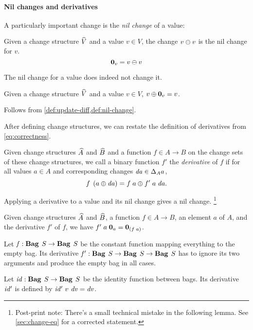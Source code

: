 \paragraph{Nil changes and derivatives}
A particularly important change is the \emph{nil change} of a value:
\begin{definition}
  \label{def:nil-change}
  Given a change structure $\widehat{V}$ and a value $v \in V$, the change
  $\Diff{v}{v}$ is the nil change for $v$.
  \[
    \Nil{v} = \Diff{v}{v} \qed
  \]
\end{definition}
The nil change for a value does indeed not change it.
\begin{lemma}
  \label{thm:update-nil}
  Given a change structure $\widehat{V}$ and a value $v \in V$,
  $\Apply{\Nil{v}}{v} = v$.
\end{lemma}

\begin{optionalproof}
Follows from \cref{def:update-diff,def:nil-change}.
\end{optionalproof}

After defining change structures, we can restate the definition of derivatives from \cref{eq:correctness}.

\begin{definition}[Derivatives]
  \label{def:derivatives}
  Given change structures $\widehat{A}$ and $\widehat{B}$ and a function $f \in A \to
  B$ on the change sets of these change structures, we call a binary function $f'$ the \emph{derivative} of $f$ if
  for all values $a \in A$ and corresponding changes $\D a \in
  \Change[A]{a}$,
  \[\App{f}{\Apply*{\D a}{a}} = \Apply{\App{\App{f'}{a}}{\D a}}{\App{f}{a}}\text{.}\qed\]
\end{definition}

Applying a derivative to a value and its nil change gives a nil
change.%
\footnote{Post-print note: There's a small technical mistake in
  the following lemma. See \cref{sec:change-eq} for a corrected
  statement.}
%
\begin{lemma}
  \label{thm:deriv-nil}
  Given change structures $\widehat{A}$ and
  $\widehat{B}$, a function $f \in A \to B$, an element $a$
  of $A$, and the derivative $f'$ of $f$, we have
  $\App{\App{f'}{a}}{\Nil{a}} = \Nil{\App* f a}$.
\end{lemma}

\begin{examples}
Let $\Term{f}:\Fun{\Bag S}{\Bag S}$ be the constant function mapping
everything to the empty bag. Its derivative
$\Term{f'}:\Fun{\Bag S}{\Fun{\Bag S}{\Bag S}}$ has to ignore its two
arguments and produce the empty bag in all cases.

Let $\Term{id}:\Fun{\Bag S}{\Bag S}$ be the identity function between
bags. Its derivative $\mathit{id'}$ is defined by
$\mathit{id'}~v~\mathit{dv} = \mathit{dv}$.
\end{examples}


